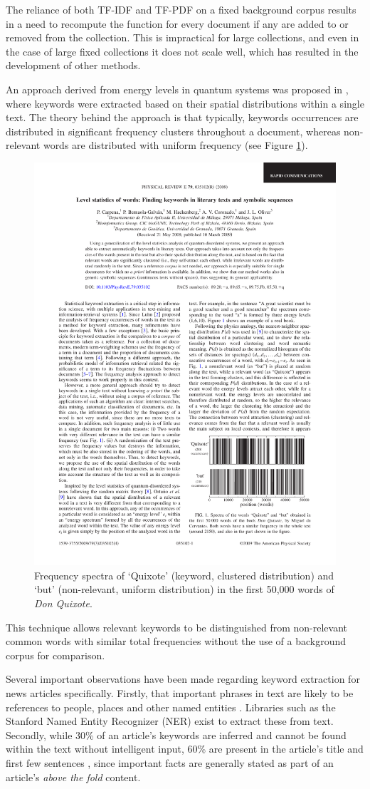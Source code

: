 The reliance of both TF-IDF and TF-PDF on a fixed background corpus results in a need to recompute the function for every document if any are added to or removed from the collection. This is impractical for large collections, and even in the case of large fixed collections it does not scale well, which has resulted in the development of other methods.

An approach derived from energy levels in quantum systems was proposed in \citep{LevelStatisticsOfWords}, where keywords were extracted based on their spatial distributions within a single text. The theory behind the approach is that typically, keywords occurrences are distributed in significant frequency clusters throughout a document, whereas non-relevant words are distributed with uniform frequency (see Figure \ref{fig:ols-spectra}).

\begin{figure}[htbp!]
	\centering
	\includegraphics[width=.6\textwidth]{img/lit-survey/ols-keyword-spectra.pdf}
	\caption{Frequency spectra of `Quixote' (keyword, clustered distribution) and `but' (non-relevant, uniform distribution) in the first 50,000 words of \textit{Don Quixote}.}
	\label{fig:ols-spectra}
\end{figure}

This technique allows relevant keywords to be distinguished from non-relevant common words with similar total frequencies without the use of a background corpus for comparison.

Several important observations have been made regarding keyword extraction for news articles specifically. Firstly, that important phrases in text are likely to be references to people, places and other named entities \citep{NewsStand}. Libraries such as the Stanford Named Entity Recognizer (NER) \citep{NestedNamedEntityRecognition} exist to extract these from text. Secondly, while 30\% of an article's keywords are inferred and cannot be found within the text without intelligent input, 60\% are present in the article's title and first few sentences \citep{IdentifyingTopicsByPosition}, since important facts are generally stated as part of an article's \textit{above the fold} content.

